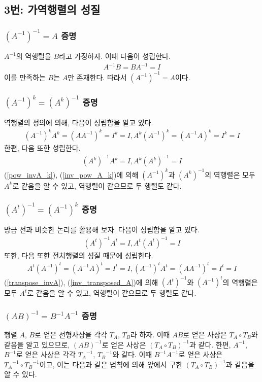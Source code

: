 \subsection{3번: 가역행렬의 성질}
\subsubsection{$(A^{-1})^{-1}=A$ 증명}
$A^{-1}$의 역행렬을 $B$라고 가정하자. 이때 다음이 성립한다.
\begin{align*}
A^{-1}B=BA^{-1}=I
\end{align*}
이를 만족하는 $B$는 $A$만 존재한다. 따라서 $(A^{-1})^{-1}=A$이다.

\subsubsection{$(A^{-1})^k=(A^k)^{-1}$ 증명}
역행렬의 정의에 의해, 다음이 성립함을 알고 있다.
\begin{align}\label{pow_invA_k}
(A^{-1})^kA^k=(AA^{-1})^k=I^k=I, A^k(A^{-1})^k=(A^{-1}A)^k=I^k=I
\end{align}
한편, 다음 또한 성립한다.
\begin{align}\label{inv_pow_A_k}
(A^k)^{-1}A^k=I, A^k(A^k)^{-1}=I
\end{align}
(\ref{pow_invA_k}), (\ref{inv_pow_A_k})에 의해 $(A^{-1})^k$과 $(A^k)^{-1}$의 역행렬은 모두 $A^k$로 같음을 알 수 있고, 역행렬이 같으므로 두 행렬도 같다.

\subsubsection{$(A^t)^{-1}=(A^{-1})^k$ 증명}
방금 전과 비슷한 논리를 활용해 보자. 다음이 성립함을 알고 있다.
\begin{align}\label{transpose_invA}
(A^t)^{-1}A^t=I, A^t(A^t)^{-1}=I
\end{align}
또한, 다음 또한 전치행렬의 성질 때문에 성립한다.
\begin{align}\label{inv_transposed_A}
A^t(A^{-1})^t=(A^{-1}A)^t=I^t=I, (A^{-1})^tA^t=(AA^{-1})^t=I^t=I
\end{align}
(\ref{transpose_invA}), (\ref{inv_transposed_A})에 의해 $(A^t)^{-1}$와 $(A^{-1})^t$의 역행렬은 모두 $A^t$로 같음을 알 수 있고, 역행렬이 같으므로 두 행렬도 같다.

\subsubsection{$(AB)^{-1}=B^{-1}A^{-1}$ 증명}
행렬 $A$, $B$로 얻은 선형사상을 각각 $T_A$, $T_B$라 하자. 이때 $AB$로 얻은 사상은 $T_A\circ T_B$와 같음을 알고 있으므로, $(AB)^{-1}$로 얻은 사상은 $(T_A\circ T_B)^{-1}$과 같다. 한편, $A^{-1}$, $B^{-1}$로 얻은 사상은 각각 ${T_A}^{-1}$, ${T_B}^{-1}$와 같다. 이때 $B^{-1}A^{-1}$로 얻은 사상은 ${T_A}^{-1}\circ {T_B}^{-1}$이고, 이는 다음과 같은 법칙에 의해 앞에서 구한 $(T_A\circ T_B)^{-1}$과 같음을 알 수 있다.

